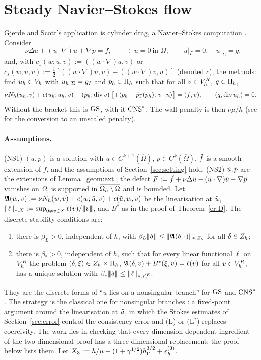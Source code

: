 \section{Steady Navier--Stokes flow}\label{sec:ns}

Gjerde and Scott's application is cylinder drag, a Navier--Stokes computation \cite{GjerdeScott2024}. Consider
\[
-\nu\Delta u+(u\cdot\nabla)u+\nabla p=f,\qquad\div u=0\ \text{in }\Omega,\qquad u|_\Gamma=0,\quad u|_\Sigma=g,
\]
and, with $c_1(w;u,v):=((w\cdot\nabla)u,v)$ or $c_s(w;u,v):=\frac12[((w\cdot\nabla)u,v)-((w\cdot\nabla)v,u)]$ (denoted $c$), the methods: find $u_h\in V_h$ with $u_h|_\Sigma=g_I$ and $p_h\in\Pi_h$ such that for all $v\in V_h^R$, $q\in\Pi_h$,
\[
\nu N_h(u_h,v)+c(u_h;u_h,v)-(p_h,\operatorname{div} v)\;\bigl[+\langle p_h-\bar p_{\Gamma}(p_h),\, v\cdot n\rangle\bigr]=(\tilde f,v),\qquad(q,\operatorname{div} u_h)=0 .
\]
Without the bracket this is $\mathrm{GS}$, with it $\mathrm{CNS}^\ast$. The wall penalty is then $\nu\mu/h$ (see \cite{PadhiLong2D} for the conversion to an unscaled penalty).

\paragraph{Assumptions.} (NS1) $(u,p)$ is a solution with $u\in C^{k+1}(\overline\Omega)$, $p\in C^k(\overline\Omega)$, $\tilde f$ is a smooth extension of $f$, and the assumptions of Section~\ref{sec:setting} hold. (NS2) $\tilde u,\tilde p$ are the extensions of Lemma~\ref{geom:ext}; the defect $F:=\tilde f+\nu\Delta\tilde u-(\tilde u\cdot\nabla)\tilde u-\nabla\tilde p$ vanishes on $\Omega$, is supported in $\overline{\Omega_h\setminus\Omega}$ and is bounded. Let $\mathfrak A(w,v):=\nu N_h(w,v)+c(w;\tilde u,v)+c(\tilde u;w,v)$ be the linearisation at $\tilde u$, $\lVert \ell\rVert_{\ast,X}:=\sup_{0\ne v\in X}\ell(v)/|\!|\!|v|\!|\!|$, and $B^\ast$ as in the proof of Theorem~\ref{er:D}. The discrete stability conditions are:
\begin{enumerate}
\item[(L)] there is $\beta_L>0$, independent of $h$, with $\beta_L|\!|\!|\delta|\!|\!|\le\lVert \mathfrak A(\delta,\cdot)\rVert_{\ast,Z_h}$ for all $\delta\in Z_h$;
\item[(L$^\ast$)] there is $\beta_\ast>0$, independent of $h$, such that for every linear functional $\ell$ on $V_h^R$ the problem $(\delta,\xi)\in Z_h\times\Pi_h$, $\mathfrak A(\delta,v)+B^\ast(\xi,v)=\ell(v)$ for all $v\in V_h^R$, has a unique solution with $\beta_\ast|\!|\!|\delta|\!|\!|\le\lVert \ell\rVert_{\ast,V_h^R}$.
\end{enumerate}
They are the discrete forms of ``$u$ lies on a nonsingular branch'' for $\mathrm{GS}$ and $\mathrm{CNS}^\ast$. The strategy is the classical one for nonsingular branches \cite{BRR1980}: a fixed-point argument around the linearisation at $\tilde u$, in which the Stokes estimates of Section~\ref{sec:error} control the consistency error and (L) or (L$^\ast$) replaces coercivity. The work lies in checking that every dimension-dependent ingredient of the two-dimensional proof has a three-dimensional replacement; the proof below lists them. Let $X_3:=h/\mu+(1+\gamma^{1/2})h_\Gamma^{3/2}+\varepsilon_h^{(3)}$.

